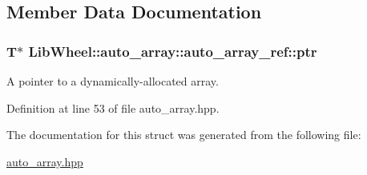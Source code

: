 \subsection{\-Member \-Data \-Documentation}
\hypertarget{structLibWheel_1_1auto__array_1_1auto__array__ref_aa1b85aa832adb49bc9981635fee6047e}{
\subsubsection[{ptr}]{\setlength{\rightskip}{0pt plus 5cm}\-T$\ast$ {\bf \-Lib\-Wheel\-::auto\-\_\-array\-::auto\-\_\-array\-\_\-ref\-::ptr}}}
\label{structLibWheel_1_1auto__array_1_1auto__array__ref_aa1b85aa832adb49bc9981635fee6047e}


\-A pointer to a dynamically-\/allocated array. 



\-Definition at line 53 of file auto\-\_\-array.\-hpp.



\-The documentation for this struct was generated from the following file\-:\begin{DoxyCompactItemize}
\item 
\hyperlink{auto__array_8hpp}{auto\-\_\-array.\-hpp}\end{DoxyCompactItemize}
